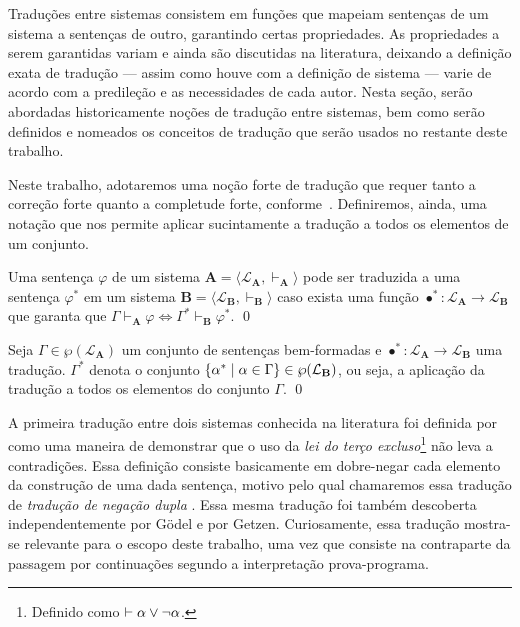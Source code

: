 Traduções entre sistemas consistem em funções que mapeiam sentenças de um sistema a sentenças de outro, garantindo certas propriedades. As propriedades a serem garantidas variam e ainda são discutidas na literatura, deixando a definição exata de tradução --- assim como houve com a definição de sistema --- varie de acordo com a predileção e as necessidades de cada autor. Nesta seção, serão abordadas historicamente noções de tradução entre sistemas, bem como serão definidos e nomeados os conceitos de tradução que serão usados no restante deste trabalho.

Neste trabalho, adotaremos uma noção forte de tradução que requer tanto a correção forte quanto a completude forte, conforme~\cite{Coniglio}. Definiremos, ainda, uma notação que nos permite aplicar sucintamente a tradução a todos os elementos de um conjunto.

\begin{definition}[Tradução] 
    Uma sentença $\varphi$ de um sistema $\mathbf{A} = \langle \mathcal{L}_\mathbf{A}, \vdash_\mathbf{A}\rangle$ pode ser traduzida a uma sentença $\varphi^*$ em um sistema $\mathbf{B} = \langle \mathcal{L}_\mathbf{B}, \vdash_\mathbf{B} \rangle$ caso exista uma função $\bullet^* : \mathcal{L}_\mathbf{A} \to \mathcal{L}_\mathbf{B}$ que garanta que $\Gamma \vdash_\mathbf{A} \varphi \Leftrightarrow \Gamma^* \vdash_\mathbf{B} \varphi^*$.
    \qed{}
\end{definition}

\begin{notation}
    Seja $\Gamma\in\wp(\mathcal{L}_\mathbf{A})$ um conjunto de sentenças bem-formadas e $\bullet^*\mathrel{:}\mathcal{L}_\mathbf{A}\to\mathcal{L}_\mathbf{B}$ uma tradução. $\Gamma^*$ denota o conjunto $\left\{\alpha^*\mid\alpha\in\Gamma\right\}\in\wp(\mathcal{L}_\mathbf{B})$, ou seja, a aplicação da tradução a todos os elementos do conjunto $\Gamma$.
    \qed{}
\end{notation}

A primeira tradução entre dois sistemas conhecida na literatura foi definida por~\cite{Kolmogorov} como uma maneira de demonstrar que o uso da \emph{lei do terço excluso}\footnote{Definido como $\mathrel{\vdash}\alpha\vee\neg\alpha$.} não leva a contradições. Essa definição consiste basicamente em dobre-negar cada elemento da construção de uma dada sentença, motivo pelo qual chamaremos essa tradução de \emph{tradução de negação dupla} \citep{Coniglio}. Essa mesma tradução foi também descoberta independentemente por Gödel e por Getzen. Curiosamente, essa tradução mostra-se relevante para o escopo deste trabalho, uma vez que consiste na contraparte da passagem por continuações segundo a interpretação prova-programa.

